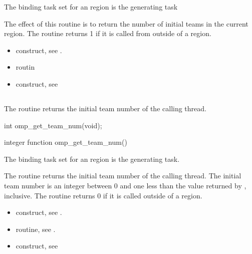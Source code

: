 \binding
The binding task set for an  region is 
the generating task

\effect
The effect of this routine is to return the number of initial 
teams in the current  region. The routine returns 1 
if it is called from outside of a  region.

\crossreferences
\begin{itemize}

\item {} construct, see
.

\item {} routin


\item {} construct, see
\end{itemize}



\subsection{}
\label{subsec:omp_get_team_num}
\summary
The  routine returns the initial team 
number of the calling thread.

\format
\begin{ccppspecific}
\begin{ompcFunction}
int omp_get_team_num(void);
\end{ompcFunction}
\end{ccppspecific}

\begin{fortranspecific}
\begin{ompfFunction}
integer function omp_get_team_num()
\end{ompfFunction}
\end{fortranspecific}

\binding
The binding task set for an  region is the generating task.

\effect
The  routine returns the initial team 
number of the calling thread. The initial team number is an 
integer between 0 and one less than the value returned by
, inclusive. The routine returns 0 
if it is called outside of a  region.

\crossreferences
\begin{itemize}

\item {} construct, see
.

\item {} routine, see
.

\item {} construct, see

\end{itemize}



